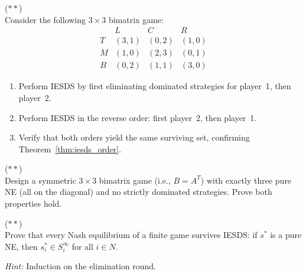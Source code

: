 \documentclass[11pt,a4paper]{article}
\begin{document}
\begin{exercise}
\label{ex:iesds_order}
\textnormal{(\(**\))} \\
Consider the following $3 \times 3$ bimatrix game:
\[
\begin{array}{c|ccc}
    & L & C & R \\ \hline
  T & (3,1) & (0,2) & (1,0) \\
  M & (1,0) & (2,3) & (0,1) \\
  B & (0,2) & (1,1) & (3,0)
\end{array}
\]
\begin{enumerate}[label=(\alph*)]
    \item Perform IESDS by first eliminating dominated strategies for
    player~1, then player~2.
    \item Perform IESDS in the reverse order: first player~2, then
    player~1.
    \item Verify that both orders yield the same surviving set, confirming
    Theorem~\ref{thm:iesds_order}.
\end{enumerate}
\end{exercise}

\begin{exercise}
\label{ex:coordination}
\textnormal{(\(**\))} \\
Design a symmetric $3 \times 3$ bimatrix game (i.e., $B = A^T$) with exactly
three pure NE (all on the diagonal) and no strictly dominated strategies.
Prove both properties hold.
\end{exercise}

\begin{exercise}
\label{ex:ne_iesds}
\textnormal{(\(**\))} \\
Prove that every Nash equilibrium of a finite game survives IESDS: if $s^*$
is a pure NE, then $s_i^* \in S_i^\infty$ for all $i \in N$.

\textit{Hint:} Induction on the elimination round.
\end{exercise}
\end{document}
